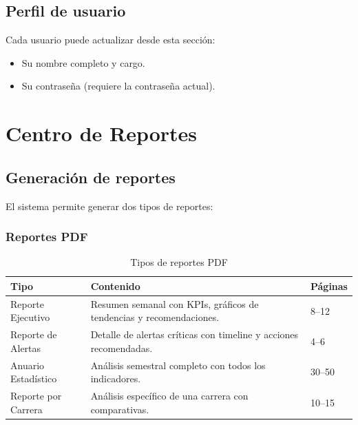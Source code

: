 \documentclass[12pt,a4paper]{article}
\begin{document}
\subsection{Perfil de usuario}
Cada usuario puede actualizar desde esta sección:
\begin{itemize}
  \item Su nombre completo y cargo.
  \item Su contraseña (requiere la contraseña actual).
\end{itemize}

\section{Centro de Reportes}

\subsection{Generación de reportes}
El sistema permite generar dos tipos de reportes:

\subsubsection{Reportes PDF}
\begin{table}[H]
\centering
\begin{tabularx}{\textwidth}{l X l}
\toprule
\textbf{Tipo} & \textbf{Contenido} & \textbf{Páginas} \\
\midrule
Reporte Ejecutivo & Resumen semanal con KPIs, gráficos de tendencias y recomendaciones. & 8--12 \\
Reporte de Alertas & Detalle de alertas críticas con timeline y acciones recomendadas. & 4--6 \\
Anuario Estadístico & Análisis semestral completo con todos los indicadores. & 30--50 \\
Reporte por Carrera & Análisis específico de una carrera con comparativas. & 10--15 \\
\bottomrule
\end{tabularx}
\caption{Tipos de reportes PDF}
\end{table}
\end{document}
